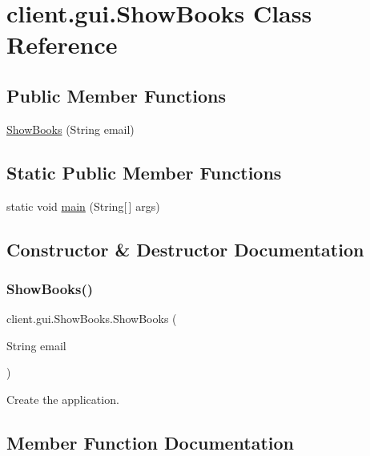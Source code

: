 \hypertarget{classclient_1_1gui_1_1_show_books}{}\section{client.\+gui.\+Show\+Books Class Reference}
\label{classclient_1_1gui_1_1_show_books}
\subsection*{Public Member Functions}
\begin{DoxyCompactItemize}
\item 
\hyperlink{classclient_1_1gui_1_1_show_books_a351bf4de3a0981ef4469005bffc1f774}{Show\+Books} (String email)
\end{DoxyCompactItemize}
\subsection*{Static Public Member Functions}
\begin{DoxyCompactItemize}
\item 
static void \hyperlink{classclient_1_1gui_1_1_show_books_acb7c683c6a19a35f85878d376c8b210e}{main} (String\mbox{[}$\,$\mbox{]} args)
\end{DoxyCompactItemize}


\subsection{Constructor \& Destructor Documentation}
\mbox{\label{classclient_1_1gui_1_1_show_books_a351bf4de3a0981ef4469005bffc1f774}} 
\subsubsection{\texorpdfstring{Show\+Books()}{ShowBooks()}}
{\footnotesize\ttfamily client.\+gui.\+Show\+Books.\+Show\+Books (\begin{DoxyParamCaption}\item[{String}]{email }\end{DoxyParamCaption})}

Create the application. 

\subsection{Member Function Documentation}
\mbox{\label{classclient_1_1gui_1_1_show_books_acb7c683c6a19a35f85878d376c8b210e}} 
